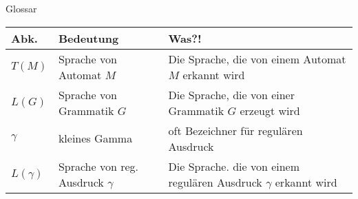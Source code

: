 %
%
%
%

\begin{frame}[fragile]{Glossar}
	\small
	\begin{tabular}{p{} p{} p{}}
		\toprule
		Abk.        & Bedeutung                          & Was?!                                                               \\
		\midrule
		$T(M)$        & Sprache von Automat $M$              & Die Sprache, die von einem Automat $M$ erkannt wird                   \\
		$L(G)$        & Sprache von Grammatik $G$            & Die Sprache, die von einer Grammatik $G$ erzeugt wird                 \\
		$\gamma$    & kleines Gamma                      & oft Bezeichner für regulären Ausdruck                               \\
		$L(\gamma)$ & Sprache von reg. Ausdruck $\gamma$ & Die Sprache. die von einem regulären Ausdruck $\gamma$ erkannt wird \\
		\bottomrule
	\end{tabular}
\end{frame}